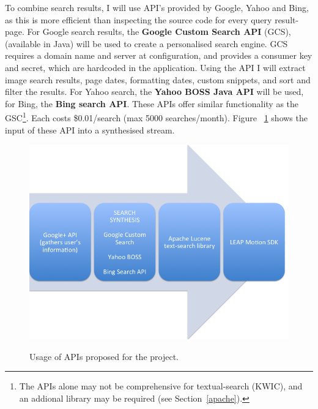 \documentclass[a4paper, 10pt]{article}
\begin{document}
To combine search results, I will use API’s provided by Google, Yahoo and Bing, as this is more efficient than inspecting the source code for every query result-page. For Google search results, the \textbf{Google Custom Search API} (GCS), (available in Java) will be used to create a personalised search engine. GCS requires a domain name and server at configuration, and provides a consumer key and secret, which are hardcoded in the application. Using the API I will extract image search results, page dates, formatting dates, custom snippets, and sort and filter the results. For Yahoo search, the \textbf{Yahoo BOSS Java API} will be used, for Bing, the \textbf{Bing search API}. These APIs offer similar functionality as the GSC\footnote{The APIs alone may not be comprehensive for textual-search (KWIC), and an addional library may be required (see Section~\ref{apache}).}. Each costs \$0.01/search (max 5000 searches/month). Figure ~\ref{apistream} shows the input of these API into a synthesised stream.

\begin{figure}[H]
\begin{center}
\includegraphics[scale=0.3]{apistream}\\
\caption{Usage of APIs proposed for the project.}
\label{apistream}
\end{center}
\end{figure}
\end{document}
